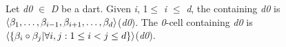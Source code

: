Let \emph{d0} $\in$ \emph{D} be a dart. Given \emph{i}, 1$\leq$ \emph{i} $\leq$ \emph{d},
the  containing \emph{d0} is 
$\langle{}\beta_1,\ldots,\beta_{i-1},\beta_{i+1},\ldots,\beta_d\rangle{}$(\emph{d0}).
The \emph{0}-cell  containing \emph{d0} is 
$\langle{}\{\beta_{i}\circ\beta_{j}|\forall i,j: 1\leq i<j \leq d\}\rangle{}$(\emph{d0}).



